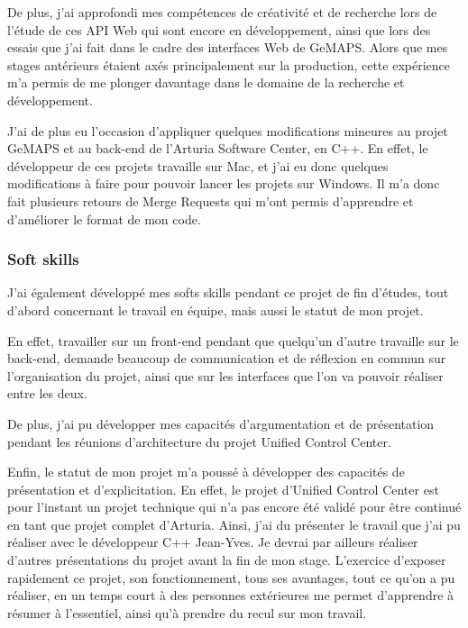 \documentclass[francais]{rapportPFE}  %
\begin{document}
De plus, j'ai approfondi mes compétences de créativité et de recherche lors de l'étude de ces API Web qui sont encore en développement, ainsi que lors des essais que j'ai fait dans le cadre des interfaces Web de GeMAPS. Alors que mes stages antérieurs étaient axés principalement sur la production, cette expérience m'a permis de me plonger davantage dans le domaine de la recherche et développement.

J'ai de plus eu l'occasion d'appliquer quelques modifications mineures au projet GeMAPS et au back-end de l'Arturia Software Center, en C++. En effet, le développeur de ces projets travaille sur Mac, et j'ai eu donc quelques modifications à faire pour pouvoir lancer les projets sur Windows. Il m'a donc fait plusieurs retours de Merge Requests qui m'ont permis d'apprendre et d'améliorer le format de mon code.






\subsubsection{Soft skills}

J'ai également développé mes softs skills pendant ce projet de fin d'études, tout d'abord concernant le travail en équipe, mais aussi le statut de mon projet.

En effet, travailler sur un front-end pendant que quelqu'un d'autre travaille sur le back-end, demande beaucoup de communication et de réflexion en commun sur l'organisation du projet, ainsi que sur les interfaces que l'on va pouvoir réaliser entre les deux.

De plus, j'ai pu développer mes capacités d'argumentation et de présentation pendant les réunions d'architecture du projet Unified Control Center. 

Enfin, le statut de mon projet m'a poussé à développer des capacités de présentation et d'explicitation. En effet, le projet d'Unified Control Center est pour l'instant un projet technique qui n'a pas encore été validé pour être continué en tant que projet complet d'Arturia. Ainsi, j'ai du présenter le travail que j'ai pu réaliser avec le développeur C++ Jean-Yves. Je devrai par ailleurs réaliser d'autres présentations du projet avant la fin de mon stage. L'exercice d'exposer rapidement ce projet, son fonctionnement, tous ses avantages, tout ce qu'on a pu réaliser, en un temps court à des personnes extérieures me permet d'apprendre à résumer à l'essentiel, ainsi qu'à prendre du recul sur mon travail.
\end{document}
